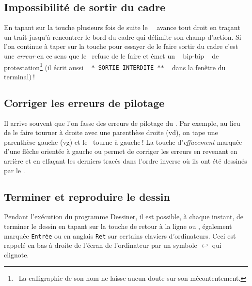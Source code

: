 \subsection{Impossibilité de sortir du cadre}

En tapant sur la touche   plusieurs fois de suite le \robot\ \robotCbN\ avance tout droit
en traçant un trait jusqu'à rencontrer le bord du cadre qui délimite son champ d'action.  
Si l'on continue à taper sur la touche
 pour essayer de le faire sortir du cadre c'est une {\em erreur} 
en ce sens que
le \robotErr\ refuse de le faire et émet un 
\raisebox{0.25ex}{$\scriptscriptstyle \boldmath\ll$}~%
bip-bip%
~\raisebox{0.25ex}{$\scriptscriptstyle \boldmath\gg$}
de 
protestation\@\footnote{\ La calligraphie de son nom
ne laisse aucun doute sur son mécontentement. 
} (il écrit aussi
\raisebox{0.25ex}{$\scriptscriptstyle \boldmath\ll$}~%
{\tt ** SORTIE INTERDITE **}%
~\raisebox{0.25ex}{$\scriptscriptstyle \boldmath\gg$}
dans la fenêtre du terminal)$\:$! 

\subsection{Corriger les erreurs de pilotage}

 Il arrive souvent que l'on fasse des erreurs de pilotage du \robotErr. Par
exemple, au lieu de le faire tourner à droite avec une 
parenthèse droite \touche{)} ({\idt vd}), on tape une parenthèse gauche 
\touche{(} ({\idt vg}) et le \robotErr\ tourne
à gauche$\:$! La touche d'{\em effacement} marquée d'une flèche 
orientée à gauche 
\hspace{0.3ex}\framebox[11.mm][l]{$\leftarrow$~~~}\hspace{0.3ex}
ou \hspace{0.3ex}\hspace{0.3ex}
permet de corriger les erreurs en revenant en arrière et en effaçant
les derniers tracés dans l'ordre inverse où ils ont été
dessinés par le \robot.

\subsection{Terminer et reproduire le dessin}

Pendant l'exécution du programme {\idt Des\-si\-ner}, 
il est possible,  à chaque ins\-tant, de
terminer le dessin en tapant sur la touche de retour à la ligne 
\hbox{\framebox[11.mm][l]{$\hookleftarrow$~~~}\hspace{0.3ex}} 
ou \hspace{0.3ex}\hspace{0.3ex}, également
marquée {\small\tt Entrée} ou en anglais {\small\tt Ret} sur certains  claviers d'ordinateurs. Ceci est rappelé 
en bas à droite de l'écran de l'ordinateur par un symbole 
$\hookleftarrow$ qui clignote. 


